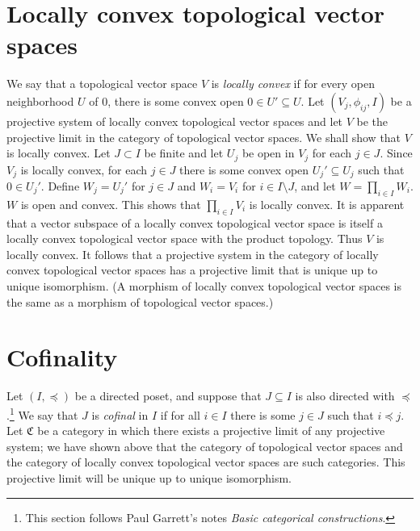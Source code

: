 \documentclass{article}
\begin{document}
\section{Locally convex topological vector spaces}
We say that a topological vector space $V$ is {\em locally convex} if for every open neighborhood $U$ of $0$, there is some convex open $0 \in U' \subseteq U$.
Let $(V_j,\phi_{ij},I)$ be a projective system of locally convex topological vector spaces and let $V$ be the projective limit in the category of topological vector spaces. 
We shall show that $V$ is locally convex.
Let $J \subset I$ be finite and let $U_j$ be open in $V_j$ for each $j \in J$. Since $V_j$ is locally convex, for each $j \in J$ there is some convex open $U_j' \subseteq U_j$ such that $0 \in U_j'$. Define $W_j = U_j'$ for $j \in J$ and $W_i=V_i$ for $i \in I \setminus J$, and let $W = \prod_{i \in I} W_i$. $W$ is open and convex. This shows that
$\prod_{i \in I} V_i$ is locally convex. It is apparent that a vector subspace of a locally convex topological vector space is itself a locally convex topological vector
space with the product topology. Thus $V$ is locally convex. It follows that a projective system in the category of locally convex topological vector spaces has a
projective limit that is unique up to unique isomorphism. (A morphism of locally convex topological vector spaces is the same as a morphism of topological vector spaces.) 

\section{Cofinality}
Let $(I,\preceq)$ be a directed poset, and suppose that $J \subseteq I$ is also  directed with $\preceq$.\footnote{This section follows Paul Garrett's notes
{\em Basic categorical constructions}.} We say that $J$ is {\em cofinal} in $I$ if 
for all $i \in I$ there is some $j \in J$ such that $i \preceq j$. Let $\mathfrak{C}$ be a category in which there exists a projective
limit of any projective system; we have shown above that the category of topological vector spaces and the category
of locally convex topological vector spaces are such categories. This projective limit will be unique up to unique isomorphism.  
\end{document}
